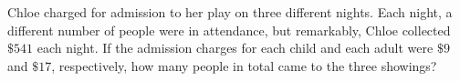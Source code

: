 Chloe charged for admission to her play on three different nights. Each night, a different number of people were in attendance, but remarkably, Chloe collected $\$541$ each night. If the admission charges for each child and each adult were $\$9$ and $\$17$, respectively, how many people in total came to the three showings?
